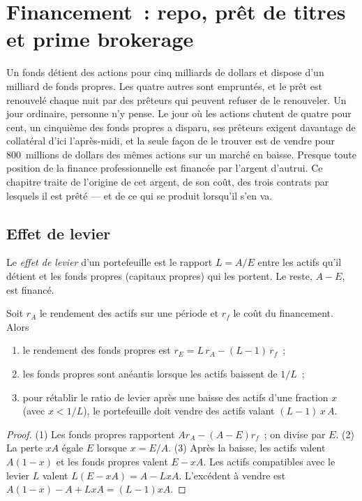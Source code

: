 \chapter{Financement~: repo, prêt de titres et prime brokerage}\label{ch:m1:financing}

Un fonds détient des actions pour cinq milliards de dollars et dispose
d'un milliard de fonds propres. Les quatre autres sont empruntés, et le prêt est renouvelé chaque nuit par
des prêteurs qui peuvent refuser de le renouveler. Un jour ordinaire, personne
n'y pense. Le jour où les actions chutent de quatre pour cent, un cinquième des
fonds propres a disparu, ses prêteurs exigent davantage de collatéral d'ici l'après-midi, et la seule
façon de le trouver est de vendre pour 800~millions de dollars des mêmes actions sur un marché
en baisse. Presque toute position de la finance professionnelle est financée par
l'argent d'autrui. Ce chapitre traite de l'origine de cet argent,
de son coût, des trois contrats par lesquels il est prêté --- et de ce qui
se produit lorsqu'il s'en va.

\section{Effet de levier}

\begin{definition}\label{def:m1:financing:leverage}
Le \emph{effet de levier} d'un portefeuille est le rapport $L = A/E$
entre les actifs qu'il détient et les fonds propres (capitaux propres) qui les
portent. Le reste, $A - E$, est financé.
\end{definition}

\begin{proposition}\label{prop:m1:financing:roe}
Soit $r_A$ le rendement des actifs sur une période et $r_f$ le coût du financement. Alors
\begin{enumerate}
\item le rendement des fonds propres est $r_E = L\,r_A - (L-1)\,r_f$~;
\item les fonds propres sont anéantis lorsque les actifs baissent de $1/L$~;
\item pour rétablir le ratio de levier après une baisse des actifs d'une fraction $x$
(avec $x < 1/L$), le portefeuille doit vendre des actifs valant $(L-1)\,x\,A$.
\end{enumerate}
\end{proposition}
\begin{proof}
(1) Les fonds propres rapportent $A r_A - (A-E) r_f$~; on divise par $E$. (2) La perte $xA$
égale $E$ lorsque $x = E/A$. (3) Après la baisse, les actifs valent $A(1-x)$ et les
fonds propres valent $E - xA$. Les actifs compatibles avec le levier $L$ valent $L(E - xA) = A - LxA$.
L'excédent à vendre est $A(1-x) - A + LxA = (L-1)xA$.
\end{proof}

